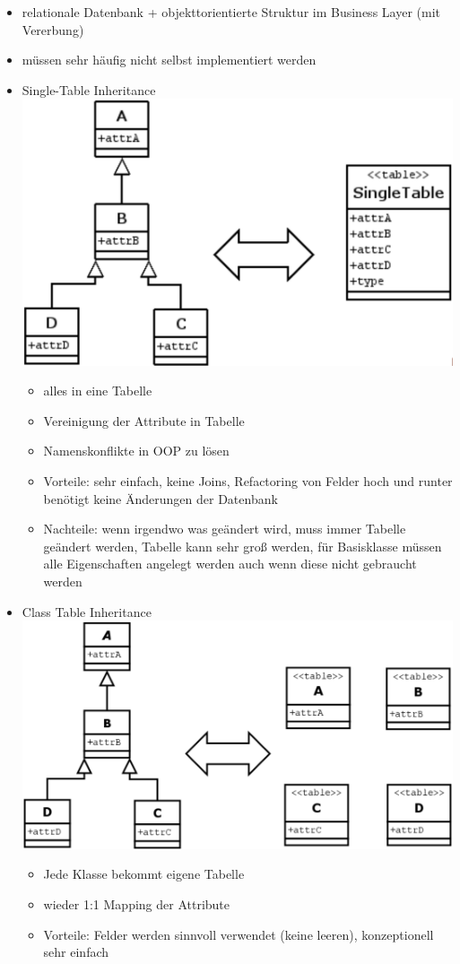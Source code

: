 \documentclass[paper=a4, fontsize=11pt]{scrartcl} %
\numberwithin{equation}{section} %
\numberwithin{figure}{section} %
\numberwithin{table}{section} %
\begin{document}
\begin{itemize}
\begin{itemize}
\begin{itemize}
      \item relationale Datenbank + objekttorientierte Struktur im Business Layer (mit Vererbung)
      \item müssen sehr häufig nicht selbst implementiert werden
      \item Single-Table Inheritance\\
      \includegraphics[width=.5\textwidth]{imgs/singletableinheritance}
      \begin{itemize}
        \item alles in eine Tabelle
        \item Vereinigung der Attribute in Tabelle
        \item Namenskonflikte in OOP zu lösen
        \item Vorteile: sehr einfach, keine Joins, Refactoring von Felder hoch und runter benötigt keine Änderungen der Datenbank
        \item Nachteile: wenn irgendwo was geändert wird, muss immer Tabelle geändert werden, Tabelle kann sehr groß werden, für Basisklasse müssen alle Eigenschaften angelegt werden auch wenn diese nicht gebraucht werden
      \end{itemize}
      \item Class Table Inheritance\\
      \includegraphics[width=.5\textwidth]{imgs/classtableinheritance}
      \begin{itemize}
        \item Jede Klasse bekommt eigene Tabelle
        \item wieder 1:1 Mapping der Attribute
        \item Vorteile: Felder werden sinnvoll verwendet (keine leeren), konzeptionell sehr einfach

\end{itemize}
\end{itemize}
\end{itemize}
\end{itemize}
\end{document}
